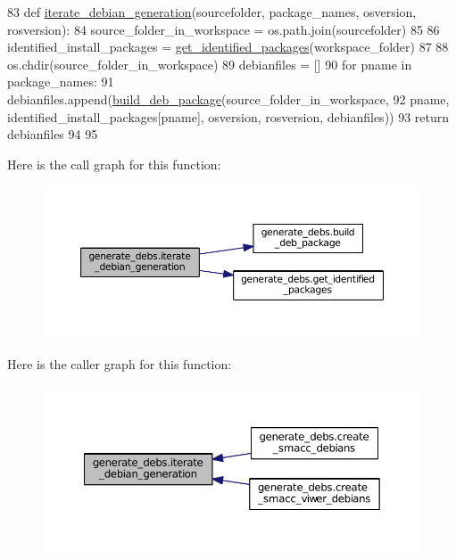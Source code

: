 \begin{DoxyCode}
83 \textcolor{keyword}{def }\hyperlink{namespacegenerate__debs_ad76fdfddc2dad3b2dc5b98239c6125d5}{iterate\_debian\_generation}(sourcefolder, package\_names, osversion, rosversion):
84     source\_folder\_in\_workspace = os.path.join(sourcefolder)
85 
86     identified\_install\_packages = \hyperlink{namespacegenerate__debs_aa91b87c6d9c3ed04015845cc9298431a}{get\_identified\_packages}(workspace\_folder)
87 
88     os.chdir(source\_folder\_in\_workspace)
89     debianfiles = []
90     \textcolor{keywordflow}{for} pname \textcolor{keywordflow}{in} package\_names:
91         debianfiles.append(\hyperlink{namespacegenerate__debs_aa70c3f4917ddc57b13eaed8501f571a8}{build\_deb\_package}(source\_folder\_in\_workspace,
92                                              pname, identified\_install\_packages[pname], osversion, 
      rosversion, debianfiles))
93     \textcolor{keywordflow}{return} debianfiles
94 
95 
\end{DoxyCode}


Here is the call graph for this function\+:
\nopagebreak
\begin{figure}[H]
\begin{center}
\leavevmode
\includegraphics[width=350pt]{namespacegenerate__debs_ad76fdfddc2dad3b2dc5b98239c6125d5_cgraph}
\end{center}
\end{figure}




Here is the caller graph for this function\+:
\nopagebreak
\begin{figure}[H]
\begin{center}
\leavevmode
\includegraphics[width=350pt]{namespacegenerate__debs_ad76fdfddc2dad3b2dc5b98239c6125d5_icgraph}
\end{center}
\end{figure}


